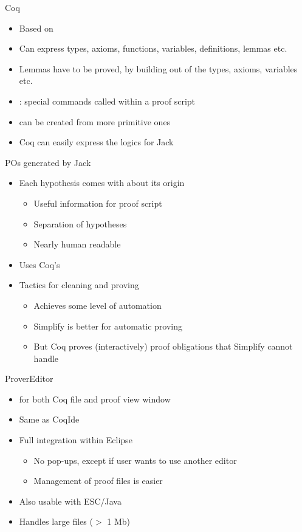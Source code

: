 \documentclass[final,nocolorBG,a4,mobius,nototal,pdf,slideColor]{prosper}
\begin{document}
\begin{slide}{Coq}
\begin{itemize}
\item Based on 
\item Can express types, axioms, functions, variables, definitions,
lemmas etc.
\item Lemmas have to be proved, by building  out of
the types, axioms, variables etc.
\item {}: special commands called within a proof script
\item {} can be created from more primitive ones
\item Coq can easily express the logics for Jack
\end{itemize}
\end{slide}


\begin{slide}{POs generated by Jack}
\begin{itemize}
\item Each hypothesis comes with  about its origin
\begin{itemize}
\item Useful information for proof script 
\item Separation of hypotheses
\item Nearly human readable
\end{itemize}
\item Uses Coq's  
\item Tactics for cleaning and proving
\begin{itemize}
\item Achieves some level of automation
\item Simplify is better for automatic proving
\item But Coq proves (interactively) proof obligations that Simplify
cannot handle
\end{itemize}
\end{itemize}
\end{slide} 

\begin{slide}{ProverEditor}
\begin{itemize}
\item {}
 for both Coq file and proof view window
\item Same  as CoqIde
\item Full integration within Eclipse
  \begin{itemize}
  \item No pop-ups, except if user wants to use another editor
  \item Management of proof files is easier
  \end{itemize}
  
\item Also usable with ESC/Java
\item Handles large files ($>$ 1 Mb)
\end{itemize}
\end{slide}
\end{document}
